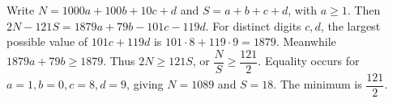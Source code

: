 Write $N=1000a+100b+10c+d$ and $S=a+b+c+d$, with $a\ge1$. Then $2N-121S=1879a+79b-101c-119d$. For distinct digits $c,d$, the largest possible value of $101c+119d$ is $101\cdot8+119\cdot9=1879$. Meanwhile $1879a+79b\ge1879$. Thus $2N\ge121S$, or $\dfrac{N}{S}\ge\dfrac{121}{2}$. Equality occurs for $a=1,b=0,c=8,d=9$, giving $N=1089$ and $S=18$. The minimum is $\boxed{\dfrac{121}{2}}$.
